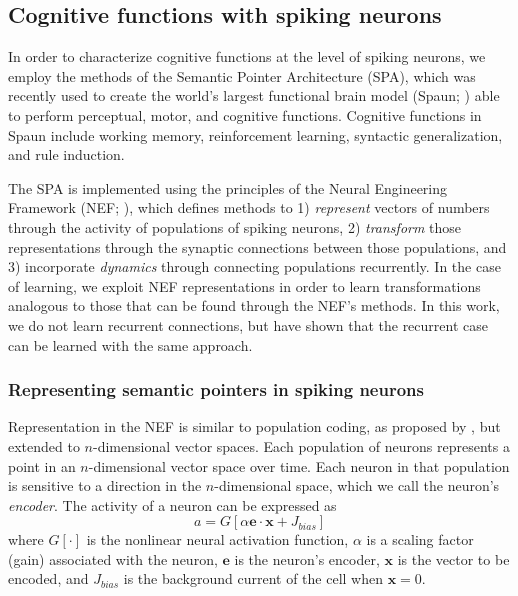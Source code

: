 \documentclass[10pt,letterpaper]{article}
\begin{document}
\subsection{Cognitive functions with spiking neurons}

In order to characterize cognitive functions
at the level of spiking neurons,
we employ the methods of the Semantic Pointer Architecture (SPA),
which was recently used to create the world's largest
functional brain model (Spaun; )
able to perform perceptual, motor, and cognitive functions.
Cognitive functions in Spaun include working memory,
reinforcement learning, syntactic generalization,
and rule induction.

The SPA is implemented using the principles of
the Neural Engineering Framework (NEF; ),
which defines methods to
1) \textit{represent} vectors of numbers
through the activity of populations of spiking neurons,
2) \textit{transform} those representations through
the synaptic connections between those populations, and
3) incorporate \textit{dynamics} through
connecting populations recurrently.
In the case of learning,
we exploit NEF representations in order to
learn transformations analogous
to those that can be found through the NEF's methods.
In this work, we do not learn recurrent connections,
but  have shown that the recurrent case
can be learned with the same approach.

\subsubsection{Representing semantic pointers in spiking neurons}

Representation in the NEF is
similar to population coding, as proposed by
,
but extended to $n$-dimensional vector spaces.
Each population of neurons represents
a point in an $n$-dimensional vector space over time.
Each neuron in that population is sensitive to
a direction in the $n$-dimensional space,
which we call the neuron's \textit{encoder}.
The activity of a neuron can be expressed as
\begin{equation}
	a = G[\alpha \mathbf{e} \cdot \mathbf{x} + J_{bias}]
\end{equation}
where $G[\cdot]$ is the nonlinear neural activation function,
$\alpha$ is a scaling factor (gain) associated with the neuron,
$\mathbf{e}$ is the neuron's encoder,
$\mathbf{x}$ is the vector to be encoded, and
$J_{bias}$ is the background current of the cell
when $\mathbf{x} = 0$.
\end{document}
